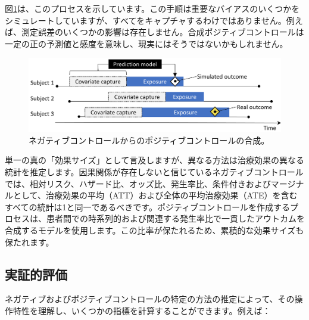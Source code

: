\documentclass[
  11pt]{book}
\theoremstyle{definition}
\theoremstyle{definition}
\theoremstyle{definition}
\theoremstyle{definition}
\theoremstyle{remark}
\begin{document}
図\ref{fig:posControlSynth}は、このプロセスを示しています。この手順は重要なバイアスのいくつかをシミュレートしていますが、すべてをキャプチャするわけではありません。例えば、測定誤差のいくつかの影響は存在しません。合成ポジティブコントロールは一定の正の予測値と感度を意味し、現実にはそうではないかもしれません。

\begin{figure}

{\centering \includegraphics[width=0.9\linewidth]{images/MethodValidity/posControlSynth} 

}

\caption{ネガティブコントロールからのポジティブコントロールの合成。}\label{fig:posControlSynth}
\end{figure}

単一の真の「効果サイズ」として言及しますが、異なる方法は治療効果の異なる統計を推定します。因果関係が存在しないと信じているネガティブコントロールでは、相対リスク、ハザード比、オッズ比、発生率比、条件付きおよびマージナルとして、治療効果の平均（ATT）および全体の平均治療効果（ATE）を含むすべての統計は1と同一であるべきです。ポジティブコントロールを作成するプロセスは、患者間での時系列的および関連する発生率比で一貫したアウトカムを合成するモデルを使用します。この比率が保たれるため、累積的な効果サイズも保たれます。

\subsection{実証的評価}\label{metrics}


ネガティブおよびポジティブコントロールの特定の方法の推定によって、その操作特性を理解し、いくつかの指標を計算することができます。例えば：
\end{document}
